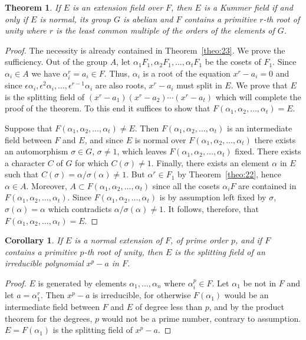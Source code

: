 \documentclass[10pt,leqno]{article}
\newtheorem{theo}{Theorem}
\newtheorem*{coro*}{Corollary}
\theoremstyle{definition}
\begin{document}
\begin{theo}
\label{theo:25}
If $E$ is an extension field over $F$, then $E$ is a Kummer field if and only if $E$ is normal, its group $G$ is abelian and $F$ contains a primitive $r$-th root of unity where $r$ is the least common multiple of the orders of the elements of $G$.
\end{theo}


\begin{proof}
The necessity is already contained in Theorem~\ref{theo:23}.
We prove the sufficiency.
Out of the group $A$, let $\alpha_1 F_1, \alpha_2 F_1, \ldots, \alpha_t F_1$ be the cosets of $F_1$.
Since $\alpha_i \in A$ we have $\alpha_i^r = a_i \in F$.
Thus, $\alpha_i$ is a root of the equation $x^r - a_i = 0$ and since $\epsilon \alpha_i, \epsilon^2 \alpha_i, \ldots, \epsilon^{r-1} \alpha_i$ are also roots, $x^r - a_i$ must split in $E$.
We prove that $E$ is the splitting field of $(x^r - a_1) (x^r - a_2) \cdots (x^r - a_t)$ which will complete the proof of the theorem.
To this end it suffices to show that $F(\alpha_1, \alpha_2, \ldots, \alpha_t) = E$.

Suppose that $F(\alpha_1, \alpha_2, \ldots, \alpha_t) \not= E$.
Then $F(\alpha_1, \alpha_2, \ldots, \alpha_t)$ is an intermediate field between $F$ and $E$, and since $E$ is normal over $F(\alpha_1, \alpha_2, \ldots, \alpha_t)$ there exists an automorphism $\sigma \in G$, $\sigma \not= 1$, which leaves $F(\alpha_1, \alpha_2, \ldots, \alpha_t)$ fixed.
There exists a character $C$ of $G$ for which $C(\sigma) \not= 1$.
Finally, there exists an element $\alpha$ in $E$ such that $C(\sigma) = \alpha / \sigma(\alpha) \not= 1$.
But $\alpha^r \in F_1$ by Theorem~\ref{theo:22}, hence $\alpha \in A$.
Moreover, $A \subset F(\alpha_1, \alpha_2, \ldots, \alpha_t)$ since all the cosets $\alpha_i F$ are contained in $F(\alpha_1, \alpha_2, \ldots, \alpha_t)$.
Since $F(\alpha_1, \alpha_2, \ldots, \alpha_t)$ is by assumption left fixed by $\sigma$, $\sigma(\alpha) = \alpha$ which contradicts $\alpha / \sigma(\alpha) \not= 1$.
It follows, therefore, that $F(\alpha_1, \alpha_2, \ldots, \alpha_t) = E$.
\end{proof}


\begin{coro*}
If $E$ is a normal extension of $F$, of prime order $p$, and if $F$ contains a primitive $p$-th root of unity, then $E$ is the splitting field of an irreducible polynomial $x^p - a$ in $F$.
\end{coro*}

\begin{proof}
$E$ is generated by elements $\alpha_1, \ldots, \alpha_n$ where $\alpha_i^p \in F$.
Let $\alpha_1$ be not in $F$ and let $a = \alpha_1^r$.
Then $x^p - a$ is irreducible, for otherwise $F(\alpha_1)$ would be an intermediate field between $F$ and $E$ of degree less than $p$, and by the product theorem for the degrees, $p$ would not be a prime number, contrary to assumption.
$E = F(\alpha_1)$ is the splitting field of $x^p - a$.
\end{proof}
\end{document}
